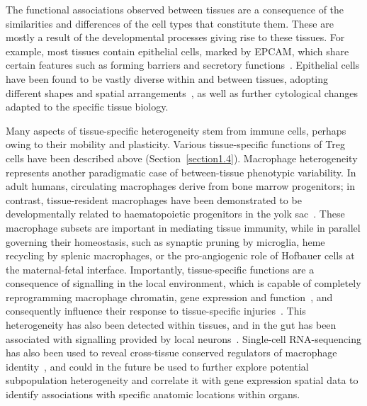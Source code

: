 The functional associations observed between tissues are a consequence of the similarities and differences of the cell types that constitute them. These are mostly a result of the developmental processes giving rise to these tissues. For example, most tissues contain epithelial cells, marked by EPCAM, which share certain features such as forming barriers and secretory functions~\citep{trzpis_epithelial_2007}. Epithelial cells have been found to be vastly diverse within and between tissues, adopting different shapes and spatial arrangements~\citep{wang_normal_2012}, as well as further cytological changes adapted to the specific tissue biology.

Many aspects of tissue-specific heterogeneity stem from immune cells, perhaps owing to their mobility and plasticity. Various tissue-specific functions of Treg cells have been described above (Section~\ref{section1.4}). Macrophage heterogeneity represents another paradigmatic case of between-tissue phenotypic variability. In adult humans, circulating macrophages derive from bone marrow progenitors; in contrast, tissue-resident macrophages have been demonstrated to be developmentally related to haematopoietic progenitors in the yolk sac~\citep{gomez_perdiguero_tissue-resident_2015}. These macrophage subsets are important in mediating tissue immunity, while in parallel governing their homeostasis, such as synaptic pruning by microglia, heme recycling by splenic macrophages, or the pro-angiogenic role of Hofbauer cells at the maternal-fetal interface. Importantly, tissue-specific functions are a consequence of signalling in the local environment, which is capable of completely reprogramming macrophage chromatin, gene expression and function~\citep{lavin_tissue-resident_2014,gosselin_environment_2014}, and consequently influence their response to tissue-specific injuries~\citep{hoyer_tissue-specific_2019}. This heterogeneity has also been detected within tissues, and in the gut has been associated with signalling provided by local neurons~\citep{gabanyi_neuro-immune_2016}. Single-cell RNA-sequencing has also been used to reveal cross-tissue conserved regulators of macrophage identity~\citep{scott_transcription_2018}, and could in the future be used to further explore potential subpopulation heterogeneity and correlate it with gene expression spatial data to identify associations with specific anatomic locations within organs.

